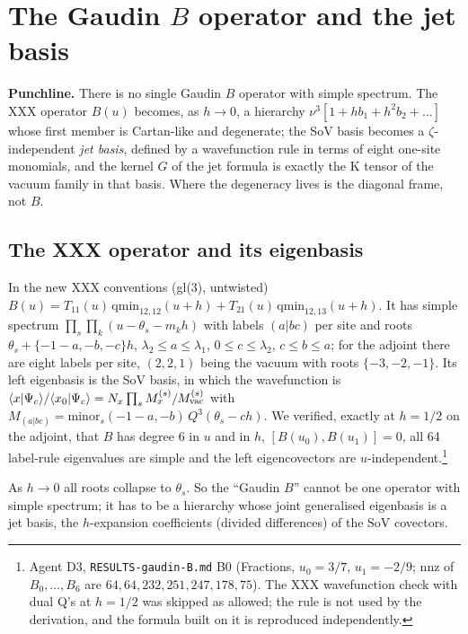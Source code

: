 \documentclass[11pt]{article}
\begin{document}
\section{The Gaudin \texorpdfstring{$B$}{B} operator and the jet basis}\label{sec:B}

\textbf{Punchline.} There is no single Gaudin $B$ operator with simple spectrum.
The XXX operator $B(u)$ becomes, as $h\to0$, a hierarchy $\nu^3[1+hb_1+h^2b_2+\dots]$ whose first member is Cartan-like and degenerate; the SoV basis becomes a $\zeta$-independent \emph{jet basis}, defined by a wavefunction rule in terms of eight one-site monomials, and the kernel $G$ of the jet formula is exactly the K tensor of the vacuum family in that basis.
Where the degeneracy lives is the diagonal frame, not $B$.

\subsection{The XXX operator and its eigenbasis}\label{sec:Bxxx}

In the new XXX conventions (gl(3), untwisted) $B(u)=T_{11}(u)\,\mathrm{qmin}_{12,12}(u+h)+T_{21}(u)\,\mathrm{qmin}_{12,13}(u+h)$. It has simple spectrum $\prod_s\prod_k(u-\theta_s-m_kh)$ with labels $(a|bc)$ per site and roots $\theta_s+\{-1-a,-b,-c\}h$, $\lambda_2\le a\le\lambda_1$, $0\le c\le\lambda_2$, $c\le b\le a$; for the adjoint there are eight labels per site, $(2,2,1)$ being the vacuum with roots $\{-3,-2,-1\}$. Its left eigenbasis is the SoV basis, in which the wavefunction is $\langle x|\Psi_c\rangle/\langle x_0|\Psi_c\rangle=N_x\prod_sM^{(s)}_x/M^{(s)}_{\rm vac}$ with $M_{(a|bc)}=\mathrm{minor}_s(-1-a,-b)\,Q^3(\theta_s-ch)$. We verified, exactly at $h=1/2$ on the adjoint, that $B$ has degree $6$ in $u$ and in $h$, $[B(u_0),B(u_1)]=0$, all 64 label-rule eigenvalues are simple and the left eigencovectors are $u$-independent.\footnote{Agent D3, \texttt{RESULTS-\allowbreak{}gaudin-\allowbreak{}B.\allowbreak{}md} B0 (Fractions, $u_0=3/7$, $u_1=-2/9$; nnz of $B_0,\dots,B_6$ are $64,64,232,251,247,178,75$).
The XXX wavefunction check with dual Q's at $h=1/2$ was skipped as allowed; the rule is not used by the derivation, and the formula built on it is reproduced independently.}

As $h\to0$ all roots collapse to $\theta_s$. So the ``Gaudin $B$'' cannot be one operator with simple spectrum; it has to be a hierarchy whose joint generalised eigenbasis is a jet basis, the $h$-expansion coefficients (divided differences) of the SoV covectors.
\end{document}
